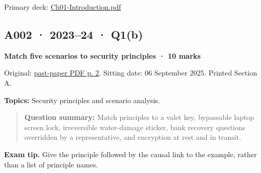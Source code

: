 \documentclass[11pt,a4paper]{article}
\begin{document}
Primary deck: \href{../slides/Ch01-Introduction.pdf}{Ch01-Introduction.\allowbreak{}pdf}




\subsection{A002 · 2023–24 · Q1(b)}\label{a002}

\textbf{Match five scenarios to security principles · 10 marks}


Original: \href{../../CSE405-Security_Merged.pdf\#page=2}{past-paper PDF p. 2}. Sitting date: 06 September 2025. Printed Section A.


\textbf{Topics:} Security principles and scenario analysis.



\begin{quote}\small

\textbf{Question summary:} Match principles to a valet key,\allowbreak{} bypassable laptop screen lock,\allowbreak{} irreversible water-damage sticker,\allowbreak{} bank recovery questions overridden by a representative,\allowbreak{} and encryption at rest and in transit.



\end{quote}


{\color{ForestGreen}\textbf{Exam tip.} Give the principle followed by the causal link to the example,\allowbreak{} rather than a list of principle names.}
\end{document}

